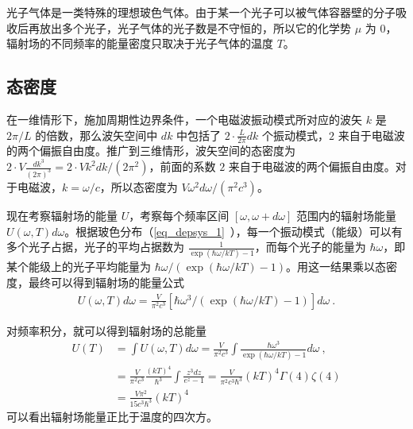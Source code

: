 
\begin{issues}
\issueDraft
\end{issues}
光子气体是一类特殊的理想玻色气体。由于某一个光子可以被气体容器壁的分子吸收后再放出多个光子，光子气体的光子数是不守恒的，所以它的化学势 $\mu$ 为 $0$，辐射场的不同频率的能量密度只取决于光子气体的温度 $T$。
\subsection{态密度}
在一维情形下，施加周期性边界条件，一个电磁波振动模式所对应的波矢 $k$ 是 $2\pi/L$ 的倍数，那么波矢空间中 $d k$ 中包括了 $2\cdot \frac{L}{2\pi} dk$ 个振动模式，$2$ 来自于电磁波的两个偏振自由度。推广到三维情形，波矢空间的态密度为 $2\cdot V \frac{dk^3}{(2\pi)^3}=2\cdot Vk^2dk/(2\pi^2)$，前面的系数 $2$ 来自于电磁波的两个偏振自由度。对于电磁波，$k=\omega/c$，所以态密度为 $V \omega^2 d\omega/(\pi^2 c^3)$。

现在考察辐射场的能量 $U$，考察每个频率区间 $[\omega,\omega+d\omega]$ 范围内的辐射场能量 $U(\omega,T)d\omega$。根据玻色分布（\autoref{eq_depsys_1}~），每一个振动模式（能级）可以有多个光子占据，光子的平均占据数为 $\frac{1}{\exp(\hbar\omega/kT)-1}$，而每个光子的能量为 $\hbar\omega$，即某个能级上的光子平均能量为 $\hbar\omega/(\exp(\hbar\omega/kT)-1)$。用这一结果乘以态密度，最终可以得到辐射场的能量公式
\begin{equation}
\begin{aligned}
U(\omega,T) d\omega=\frac{V}{\pi^2c^3} \left[\hbar\omega^3/(\exp(\hbar\omega/kT)-1)\right] d\omega~.
\end{aligned}
\end{equation}

对频率积分，就可以得到辐射场的总能量
\begin{equation}
\begin{aligned}
U(T)&=\int U(\omega,T) d\omega=\frac{V}{\pi^2c^3} \int \frac{\hbar\omega^3}{\exp(\hbar\omega/kT)-1} d\omega~,\\
&=\frac{V}{\pi^2c^3 } \frac{(kT)^4}{\hbar^3}\int \frac{z^3dz}{e^z-1}=\frac{V}{\pi^2c^3\hbar^3}(kT)^4\Gamma(4)\zeta(4)\\
&=\frac{V\pi^2}{15c^3\hbar^3}(kT)^4
\end{aligned}
\end{equation}
可以看出辐射场能量正比于温度的四次方。


